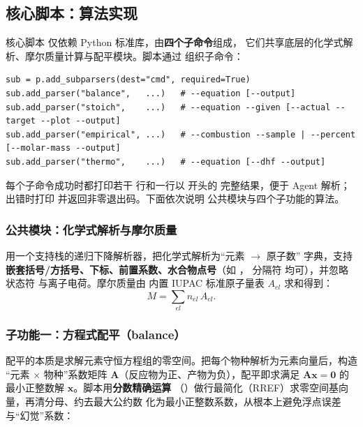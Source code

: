 \documentclass[UTF8,a4paper,12pt]{ctexart}
\begin{document}
\subsection{核心脚本：算法实现}

核心脚本  仅依赖 Python 标准库，由\textbf{四个子命令}组成，
它们共享底层的化学式解析、摩尔质量计算与配平模块。脚本通过  组织子命令：

\begin{lstlisting}
sub = p.add_subparsers(dest="cmd", required=True)
sub.add_parser("balance",   ...)   # --equation [--output]
sub.add_parser("stoich",    ...)   # --equation --given [--actual --target --plot --output]
sub.add_parser("empirical", ...)   # --combustion --sample | --percent  [--molar-mass --output]
sub.add_parser("thermo",    ...)   # --equation [--dhf --output]
\end{lstlisting}

每个子命令成功时都打印若干  行和一行以 \codepath{[JSON]} 开头的
完整结果，便于 Agent 解析；出错时打印  并返回非零退出码。下面依次说明
公共模块与四个子功能的算法。

\subsubsection{公共模块：化学式解析与摩尔质量}

 用一个支持栈的递归下降解析器，把化学式解析为``元素 $\to$ 原子数''
字典，支持\textbf{嵌套括号/方括号、下标、前置系数、水合物点号}（如 ，
分隔符  均可），并忽略状态符  与离子电荷。摩尔质量由
内置 IUPAC 标准原子量表 $A_{el}$ 求和得到：
\[
    M = \sum_{el} n_{el}\, A_{el}.
\]

\subsubsection{子功能一：方程式配平（balance）}

配平的本质是求解元素守恒方程组的零空间。把每个物种解析为元素向量后，构造
``元素 $\times$ 物种''系数矩阵 $\mathbf{A}$（反应物为正、产物为负），配平即求满足
$\mathbf{A}\mathbf{x}=\mathbf{0}$ 的最小正整数解 $\mathbf{x}$。脚本用\textbf{分数精确运算}
（）做行最简化（RREF）求零空间基向量，再清分母、约去最大公约数
化为最小正整数系数，从根本上避免浮点误差与``幻觉''系数：
\end{document}
